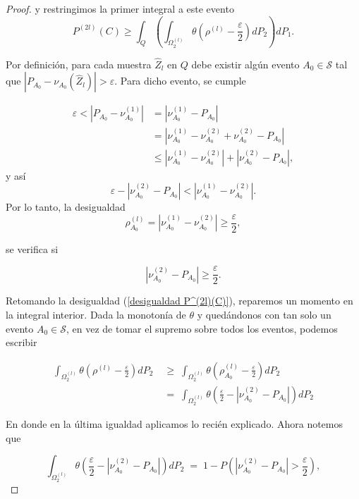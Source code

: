 \documentclass{report}
\begin{document}
\begin{proof}
y restringimos la primer integral a este evento
\begin{equation}
P^{(2l)}(C) \geq \int_{Q} \left( \int_{ \Omega_2^{(l)}}  \theta\left(\rho^{(l)}-\frac{\varepsilon}{2}\right) dP_2\right) dP_1. \label{desigualdad P^(2l)(C)}
\end{equation}

Por definición, para cada muestra $\hat{Z}_l$ en $Q$ debe existir algún evento $A_0\in\mathcal{S}$ tal que $|P_{A_0}-\nu_{A_0}\left(\hat{Z}_l\right)|>\varepsilon$.
Para dicho evento, se cumple

\[
\begin{aligned}
    \varepsilon < \left|P_{A_0}-\nu_{A_0}^{(1)}\right| &= \left|\nu_{A_0}^{(1)}-P_{A_0}\right|\\
    & = \left|\nu_{A_0}^{(1)}-\nu_{A_0}^{(2)}+\nu_{A_0}^{(2)}-P_{A_0}\right| \\
    & \leq \left|\nu_{A_0}^{(1)}-\nu_{A_0}^{(2)}\right|+\left|\nu_{A_0}^{(2)}-P_{A_0}\right|,
\end{aligned}
\]
y así
\[
    \varepsilon - \left|\nu_{A_0}^{(2)}-P_{A_0}\right| < \left|\nu_{A_0}^{(1)}-\nu_{A_0}^{(2)}\right|.
\]\newline
Por lo tanto, la desigualdad
\[
\rho_{A_0}^{(l)} = |\nu^{(1)}_{A_0}-\nu^{(2)}_{A_0}| \geq \frac{\varepsilon}{2},
\]

se verifica si 

\[
|\nu^{(2)}_{A_0}-P_{A_0}|\geq \frac{\varepsilon}{2}.
\]

Retomando la desigualdad (\ref{desigualdad P^(2l)(C)}), reparemos un momento en la integral interior. 
Dada la monotonía de $\theta$ y quedándonos
con tan solo un evento $A_0\in\mathcal{S}$, en vez de tomar el supremo sobre todos los eventos, podemos escribir

\[
\begin{aligned}
\int_{ \Omega_2^{(l)}} \theta\left(\rho^{(l)}-\frac{\varepsilon}{2}\right) dP_2 \;&\geq\; \int_{ \Omega_2^{(l)}}  \theta\left(\rho^{(l)}_{A_0}-\frac{\varepsilon}{2}\right) dP_2 \\
& = \; \int_{ \Omega_2^{(l)}}  \theta\left(\frac{\varepsilon}{2} - |\nu^{(2)}_{A_0}-P_{A_0}|\right) dP_2
\end{aligned}
\]

En donde en la última igualdad aplicamos lo recién explicado. Ahora notemos que 

\begin{equation}\label{eq: theta como probabilidad}
    \int_{ \Omega_2^{(l)}}  \theta\left(\frac{\varepsilon}{2} - |\nu^{(2)}_{A_0}-P_{A_0}|\right) dP_2 \;=\; 1 - P\left(|\nu^{(2)}_{A_0}-P_{A_0}|>\frac{\varepsilon}{2}\right),
\end{equation}



\end{proof}
\end{document}
